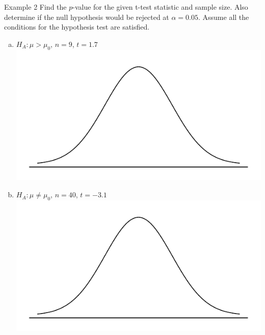 \documentclass[fleqn, 10pt]{beamer}\usepackage[]{graphicx}\usepackage[]{color}
\begin{document}
\begin{frame}{Example 2}
Find the $p$-value for the given t-test statistic and sample size.  Also determine if the null hypothesis would be rejected at $\alpha = 0.05$.  Assume all the conditions for the hypothesis test are satisfied.
\begin{enumerate}[(a)]
\item $H_A: \mu > \mu_0$, $n=9$, $t=1.7$\\
\includegraphics[scale=0.35]{figure/norm_draw.pdf}
\vspace{0.75cm}
\item $H_A: \mu \neq \mu_0$, $n=40$, $t=-3.1$\\
\includegraphics[scale=0.35]{figure/norm_draw.pdf}
\vspace{0.75cm}
\end{enumerate}
\end{frame}
\end{document}
